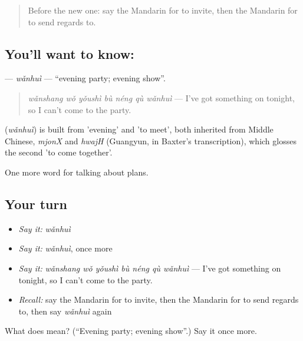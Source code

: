 \label{lesson:ZH-C173-wanhui}



\begin{quote}
Before the new one: say the Mandarin for to invite, then the Mandarin for to send regards to.
\end{quote}

\subsection*{You'll want to know: }
\textbf{} — \emph{wǎnhuì} — \textquotedblleft{}evening party; evening show\textquotedblright{}.

\begin{quote}
\textbf{} \emph{wǎnshang wǒ yǒushì bù néng qù wǎnhuì} — I've got something on tonight, so I can't come to the party.
\end{quote}

\begin{cousinweb}
\textbf{} (\emph{wǎnhuì}) is built from  'evening' and  'to meet', both inherited from Middle Chinese, \emph{mjonX} and \emph{hwajH} (Guangyun, in Baxter's transcription), which glosses the second 'to come together'.
\end{cousinweb}

\begin{grammarlens}[title={What you've built}]
One more word for talking about plans.
\end{grammarlens}

\subsection*{Your turn}
\begin{itemize}
\raggedright
  \item \emph{Say it:} \emph{wǎnhuì}
  \item \emph{Say it:} \emph{wǎnhuì}, once more
  \item \emph{Say it:} \emph{wǎnshang wǒ yǒushì bù néng qù wǎnhuì} — I've got something on tonight, so I can't come to the party.
  \item \emph{Recall:} say the Mandarin for to invite, then the Mandarin for to send regards to, then say \emph{wǎnhuì} again
\end{itemize}

\begin{tcolorbox}[breakable,colback=teal!4,colframe=teal!35!black,title={Before you move on}]
What does  mean? (\textquotedblleft{}Evening party; evening show\textquotedblright{}.) Say it once more.
\end{tcolorbox}
